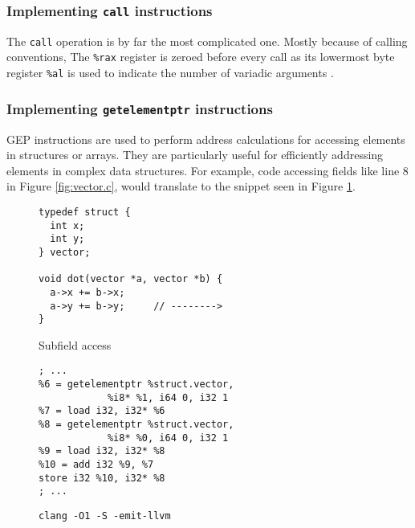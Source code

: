 \documentclass{article}
\begin{document}


\subsubsection{Implementing \texttt{call} instructions} \label{impl-call}

The \texttt{call} operation is by far the most complicated one. Mostly because of calling conventions,
The \texttt{\%rax} register is zeroed before every call as its lowermost byte register \texttt{\%al} is used to indicate the number of variadic arguments \cite[25]{sysv}.

\subsubsection{Implementing \texttt{getelementptr} instructions}\label{impl-gep}
GEP instructions are used to perform address calculations for accessing elements in  structures or arrays. They are particularly useful for efficiently addressing elements in complex data structures. For example, code accessing fields like line 8 in Figure \ref{fig:vector.c}, would  translate to the snippet seen in Figure \ref{fig:vector.ll}.

\begin{figure}[H]
   \begin{minipage}{0.48\textwidth}
     \centering
     \begin{verbatim}
typedef struct {
  int x;
  int y;
} vector;

void dot(vector *a, vector *b) {
  a->x += b->x;
  a->y += b->y;     // -------->
}

     \end{verbatim}
     \caption{Subfield access}\label{fig:vector.c}
   \end{minipage}
   \begin{minipage}{0.48\textwidth}
     \centering
     \begin{verbatim}
; ...
%6 = getelementptr %struct.vector,
            %i8* %1, i64 0, i32 1
%7 = load i32, i32* %6
%8 = getelementptr %struct.vector,
            %i8* %0, i64 0, i32 1
%9 = load i32, i32* %8
%10 = add i32 %9, %7
store i32 %10, i32* %8
; ...
     \end{verbatim}
     \caption{\texttt{clang -O1 -S -emit-llvm}}\label{fig:vector.ll}
   \end{minipage}
\end{figure}
\end{document}
